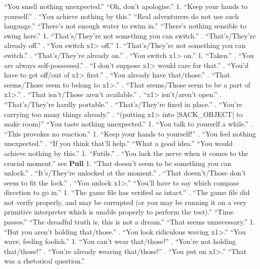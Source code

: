   ``You smell nothing unexpected.''
  ``Oh, don't apologise.''
 1. ``Keep your hands to yourself.''
. ``You achieve nothing by this.''
  ``Real adventurers do not use such language.''
   ``There's not enough water to swim in.''
  ``There's nothing sensible to swing here.''
 1. ``That's/They're not something you can switch.''
. ``That's/They're already off.''
. ``You switch \<x1> off.''
 1. ``That's/They're not something you can switch.''
. ``That's/They're already on.''
. ``You switch \<x1> on.''
   1. ``Taken.''
. ``You are always self-possessed.''
. ``I don't suppose \<x1> would care for that.''
. ``You'd have to get off/out of \<x1> first.''
. ``You already have that/those.''
. ``That seems/Those seem to belong to \<x1>.''
. ``That seems/Those seem to be a part of \<x1>.''
. ``That isn't/Those aren't available.''
. ``\<x1> isn't/aren't open.''
. ``That's/They're hardly portable.''
. ``That's/They're fixed in place.''
. ``You're carrying too many things already.''
. ``(putting \<x1> into |SACK_OBJECT| to make room)''
  ``You taste nothing unexpected.''
   1. ``You talk to yourself a while.''
. ``This provokes no reaction.''
  1. ``Keep your hands to yourself!''
. ``You feel nothing unexpected.''
. ``If you think that'll help.''
  ``What a good idea.''
   ``You would achieve nothing by this.''
 1. ``Futile.''
. ``You lack the nerve when it comes to the crucial moment.''
 see {\bf Pull}
  1. ``That doesn't seem to be something you can unlock.''
. ``It's/They're unlocked at the moment.''
. ``That doesn't/Those don't seem to fit the lock.''
. ``You unlock \<x1>.''
 ``You'll have to say which compass direction to go in.''
  1. ``The game file has verified as intact.''
. ``The game file did not verify properly, and may be corrupted
(or you may be running it on a very primitive interpreter which
is unable properly to perform the test).''
   ``Time passes.''
   ``The dreadful truth is, this is not a dream.''
 ``That seems unnecessary.''
   1. ``But you aren't holding that/those.''
. ``You look ridiculous waving \<x1>.''
 ``You wave, feeling foolish.''
   1. ``You can't wear that/those!''
. ``You're not holding that/those!''
. ``You're already wearing that/those!''
. ``You put on \<x1>.''
   ``That was a rhetorical question.''


